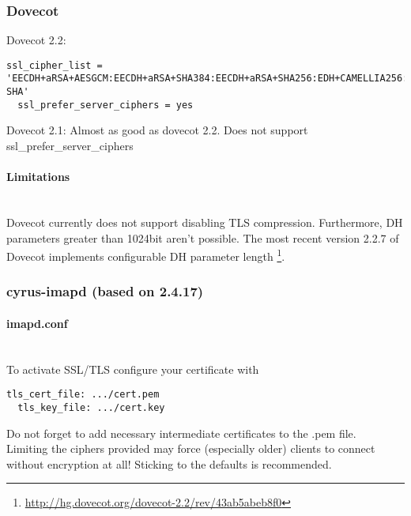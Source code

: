 \subsubsection{Dovecot}



Dovecot 2.2:


\begin{lstlisting}[breaklines]
  ssl_cipher_list = 'EECDH+aRSA+AESGCM:EECDH+aRSA+SHA384:EECDH+aRSA+SHA256:EDH+CAMELLIA256:EECDH:EDH+aRSA:+SSLv3:!aNULL:!eNULL:!LOW:!3DES:!MD5:!EXP:!PSK:!SRP:!DSS:!RC4:!SEED:!AES128:!CAMELLIA128:!ECDSA:AES256-SHA'
  ssl_prefer_server_ciphers = yes
\end{lstlisting}

Dovecot 2.1: Almost as good as dovecot 2.2. Does not support ssl\_prefer\_server\_ciphers

\paragraph*{Limitations}\mbox{}\\

Dovecot currently does not support disabling TLS compression. Furthermore, DH parameters
greater than 1024bit aren't possible. The most recent version 2.2.7 of Dovecot implements
configurable DH parameter length
\footnote{\url{http://hg.dovecot.org/dovecot-2.2/rev/43ab5abeb8f0}}.

\subsubsection{cyrus-imapd (based on 2.4.17)}

\paragraph*{imapd.conf}\mbox{}\\

To activate SSL/TLS configure your certificate with
\begin{lstlisting}[breaklines]
  tls_cert_file: .../cert.pem
  tls_key_file: .../cert.key
\end{lstlisting}

Do not forget to add necessary intermediate certificates to the .pem file.\\

Limiting the ciphers provided may force (especially older) clients to connect without encryption at all! Sticking to the defaults is recommended.\\


